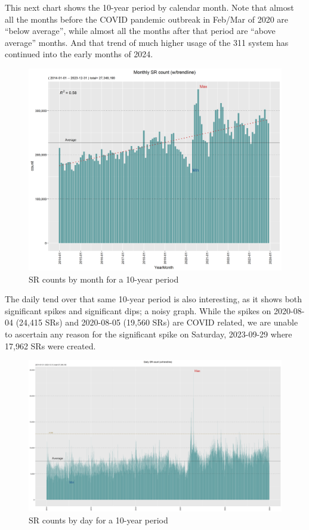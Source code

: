 \documentclass[12pt, titlepage]{article}
\begin{document}
This next chart shows the 10-year period by calendar month. Note that almost all the months before the COVID pandemic outbreak in Feb/Mar
of 2020 are ``below average'', while almost all the months after that period are ``above average'' months. And that trend of much higher usage
of the 311 system has continued into the early months of 2024.

\begin{figure}[htbp]
  \centering
  \includegraphics[scale=0.65]{Monthly.png}
  \caption{SR counts by month for a 10-year period}
  \label{fig:monthly-counts}
\end{figure}

The daily tend over that same 10-year period is also interesting, as it shows both significant spikes
and significant dips; a noisy graph. While the spikes on 2020-08-04 (24,415 SRs) and 2020-08-05 (19,560 SRs) are COVID related, we are unable to 
ascertain any reason for the significant spike on Saturday, 2023-09-29 where 17,962 SRs were created.

\begin{figure}[htbp]
  \centering
  \includegraphics[scale=0.35]{Daily.png}
  \caption{SR counts by day for a 10-year period}
  \label{fig:daily-counts}
\end{figure}
\end{document}
